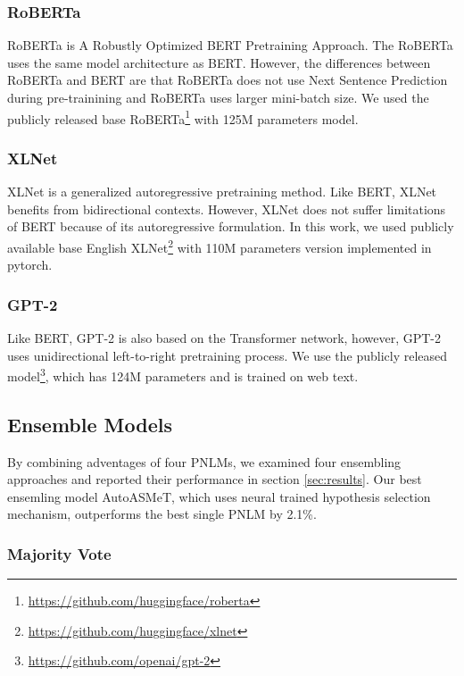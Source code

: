 \documentclass[11pt]{article}
\begin{document}
\subsubsection{RoBERTa}

RoBERTa is A Robustly Optimized BERT Pretraining Approach. The RoBERTa uses the same model architecture as BERT. However, the differences between RoBERTa and BERT are that RoBERTa does not use Next Sentence Prediction during pre-trainining and RoBERTa uses larger mini-batch size. We used the publicly released base RoBERTa\footnote{\url{https://github.com/huggingface/roberta}} with 125M parameters model.

\subsubsection{XLNet}

XLNet is a generalized autoregressive pretraining method. Like BERT, XLNet benefits from bidirectional contexts. However, XLNet does not suffer limitations of BERT because of its autoregressive formulation. In this work, we used publicly available base English XLNet\footnote{\url{https://github.com/huggingface/xlnet}} with 110M parameters version implemented in pytorch.

\subsubsection{GPT-2}

Like BERT, GPT-2 is also based on the Transformer network, however, GPT-2 uses unidirectional left-to-right pretraining process. We use the publicly released model\footnote{\url{https://github.com/openai/gpt-2}}, which has 124M parameters and is trained on web text.

\subsection{Ensemble Models} \label{sec:ensemble}

By combining adventages of four PNLMs, we examined four ensembling approaches and reported their performance in section \ref{sec:results}. Our best ensemling model AutoASMeT, which uses neural trained hypothesis selection mechanism, outperforms the best single PNLM by 2.1\%. 

\subsubsection{Majority Vote}
\end{document}
